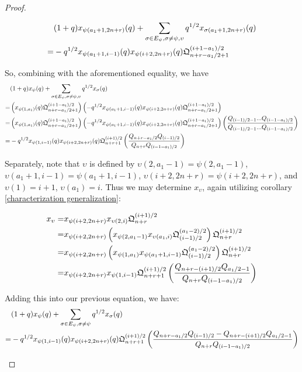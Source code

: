 \documentclass{amsart}
\begin{document}
\begin{proof}
\begin{enumerate}[label={case \arabic*:}]
 		\begin{align*}
 		&(1+q)x_{\psi(a_1+1,2n+r)}(q)+\sum_{\sigma\in E_\psi,\sigma\not=\psi,\upsilon}q^{1/2}x_{\sigma(a_1+1,2n+r)}(q)\\
 		=&-q^{1/2}x_{\psi(a_1+1,i-1)}(q)x_{\psi(i+2,2n+r)}(q)\mathfrak{Q}_{n+r-a_1/2+1}^{(i+1-a_1)/2}
 		\end{align*}
 		
 		So, combining with the aforementioned equality, we have 
 		\begin{align*}
 		&(1+q)x_\psi(q)+\sum_{\sigma\in E_\psi,\sigma\not=\psi,\upsilon}q^{1/2}x_\sigma(q)\\
 		=&\left( x_{\psi(1,a_1)}(q)\mathfrak{Q}_{n+r-a_1/2+1}^{(i+1-a_1)/2} \right)\left( -q^{1/2}x_{\psi(a_1+1,i-1)}(q)x_{\psi(i+2,2n+r)}(q)\mathfrak{Q}_{n+r-a_1/2+1}^{(i+1-a_1)/2} \right)\\
 		=&\left( x_{\psi(1,a_1)}(q)\mathfrak{Q}_{n+r-a_1/2+1}^{(i+1-a_1)/2} \right)\left( -q^{1/2}x_{\psi(a_1+1,i-1)}(q)x_{\psi(i+2,2n+r)}(q)\mathfrak{Q}_{n+r-a_1/2+1}^{(i+1-a_1)/2} \right)\left( \frac{Q_{(i-1)/2-1}...Q_{(i-1-a_1)/2}}{Q_{(i-1)/2-1}...Q_{(i-1-a_1)/2}} \right)\\
 		=&-q^{1/2}x_{\psi(1,i-1)}(q)x_{\psi(i+2,2n+r)}(q)\mathfrak{Q}_{n+r+1}^{(i+1)/2}\left( \frac{Q_{n+r-a_1/2}Q_{(i-1)/2}}{Q_{n+r}Q_{(i-1-a_1)/2}} \right)
 		\end{align*}
 		
 		Separately, note that $\upsilon$ is defined by $\upsilon(2,a_1-1)=\psi(2,a_1-1)$, $\upsilon(a_1+1,i-1)=\psi(a_1+1,i-1)$, $\upsilon(i+2,2n+r)=\psi(i+2,2n+r)$, and $\upsilon(1)=i+1$, $\upsilon(a_1)=i$. Thus we may determine $x_\upsilon$, again utilizing corollary \ref{characterization generalization}:
 		
 		\begin{align*}
 		x_\upsilon=&x_{\psi(i+2,2n+r)}x_{\upsilon(2,i)}\mathfrak{Q}_{n+r}^{(i+1)/2}\\
 		=&x_{\psi(i+2,2n+r)}\left( x_{\psi(2,a_1-1)}x_{\upsilon(a_1,i)}\mathfrak{Q}_{(i-1)/2}^{(a_1-2)/2} \right)\mathfrak{Q}_{n+r}^{(i+1)/2}\\
 		=&x_{\psi(i+2,2n+r)}\left( x_{\psi(1,a_1)}x_{\psi(a_1+1,i-1)}\mathfrak{Q}_{(i-1)/2}^{(a_1-2)/2} \right)\mathfrak{Q}_{n+r}^{(i+1)/2}\\
 		=&x_{\psi(i+2,2n+r)}x_{\psi(1,i-1)}\mathfrak{Q}_{n+r+1}^{(i+1)/2}\left( \frac{Q_{n+r-(i+1)/2}Q_{a_1/2-1}}{Q_{n+r}Q_{(i-1-a_1)/2}} \right)
 		\end{align*}
 		
 		Adding this into our previous equation, we have:
 		\begin{align*}
 		&(1+q)x_\psi(q)+\sum_{\sigma\in E_\psi,\sigma\not=\psi}q^{1/2}x_\sigma(q)\\
 		=&-q^{1/2}x_{\psi(1,i-1)}(q)x_{\psi(i+2,2n+r)}(q)\mathfrak{Q}_{n+r+1}^{(i+1)/2}\left( \frac{Q_{n+r-a_1/2}Q_{(i-1)/2}-Q_{n+r-(i+1)/2}Q_{a_1/2-1}}{Q_{n+r}Q_{(i-1-a_1)/2}} \right)
 		\end{align*}
 		

\end{enumerate}
\end{proof}
\end{document}
